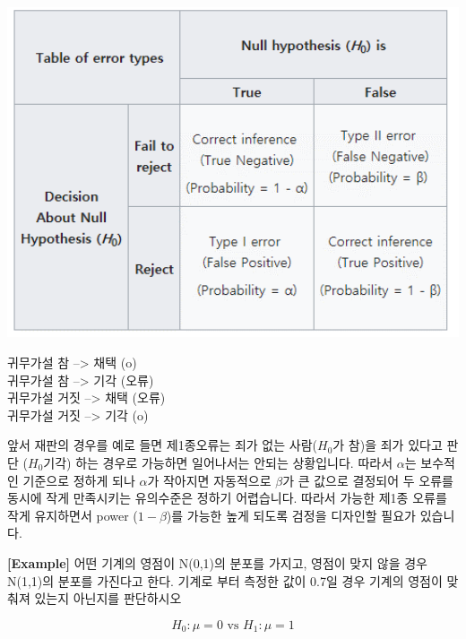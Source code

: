 \documentclass[
]{book}
\begin{document}
\includegraphics[width=6.25in,height=\textheight]{./images/09/02.png}

귀무가설 참 --\textgreater{} 채택 (o)\\
귀무가설 참 --\textgreater{} 기각 (오류)\\
귀무가설 거짓 --\textgreater{} 채택 (오류)\\
귀무가설 거짓 --\textgreater{} 기각 (o)

앞서 재판의 경우를 예로 들면 제1종오류는 죄가 없는 사람(\(H_0\)가 참)을 죄가 있다고 판단 (\(H_0\)기각) 하는 경우로 가능하면 일어나서는 안되는 상황입니다. 따라서 \(\alpha\)는 보수적인 기준으로 정하게 되나 \(\alpha\)가 작아지면 자동적으로 \(\beta\)가 큰 값으로 결정되어 두 오류를 동시에 작게 만족시키는 유의수준은 정하기 어렵습니다. 따라서 가능한 제1종 오류를 작게 유지하면서 power (\(1-\beta\))를 가능한 높게 되도록 검정을 디자인할 필요가 있습니다.

\textbf{{[}Example{]}} 어떤 기계의 영점이 N(0,1)의 분포를 가지고, 영점이 맞지 않을 경우 N(1,1)의 분포를 가진다고 한다. 기계로 부터 측정한 값이 0.7일 경우 기계의 영점이 맞춰져 있는지 아닌지를 판단하시오

\[
H_0: \mu = 0 \text{ vs } H_1: \mu = 1
\]
\end{document}
